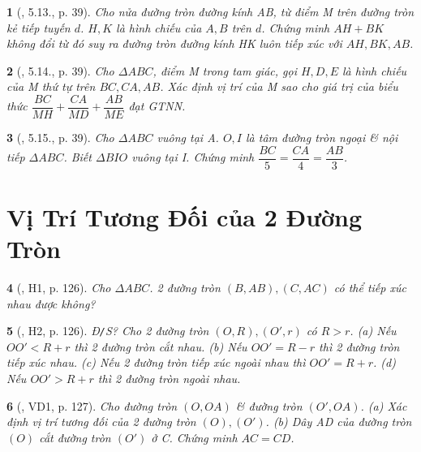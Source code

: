 \documentclass{article}
\newtheorem{baitoan}{}
\begin{document}
\begin{baitoan}[\cite{TLCT_THCS_Toan_9_hinh_hoc}, 5.13., p. 39]
	Cho nửa đường tròn đường kính AB, từ điểm M trên đường tròn kẻ tiếp tuyến $d$. $H,K$ là hình chiếu của $A,B$ trên $d$. Chứng minh $AH + BK$ không đổi từ đó suy ra đường tròn đường kính HK luôn tiếp xúc với $AH,BK,AB$.
\end{baitoan}

\begin{baitoan}[\cite{TLCT_THCS_Toan_9_hinh_hoc}, 5.14., p. 39]
	Cho $\Delta ABC$, điểm M trong tam giác, gọi $H,D,E$ là hình chiếu của M thứ tự trên $BC,CA,AB$. Xác định vị trí của M sao cho giá trị của biểu thức $\dfrac{BC}{MH} + \dfrac{CA}{MD} + \dfrac{AB}{ME}$ đạt {\rm GTNN}.
\end{baitoan}

\begin{baitoan}[\cite{TLCT_THCS_Toan_9_hinh_hoc}, 5.15., p. 39]
	Cho $\Delta ABC$ vuông tại A. $O,I$ là tâm đường tròn ngoại \& nội tiếp $\Delta ABC$. Biết $\Delta BIO$ vuông tại I. Chứng minh $\dfrac{BC}{5} = \dfrac{CA}{4} = \dfrac{AB}{3}$.
\end{baitoan}


\section{Vị Trí Tương Đối của 2 Đường Tròn}

\begin{baitoan}[\cite{Binh_boi_duong_Toan_9_tap_1}, H1, p. 126]
	Cho $\Delta ABC$. 2 đường tròn $(B,AB),(C,AC)$ có thể tiếp xúc nhau được không?
\end{baitoan}

\begin{baitoan}[\cite{Binh_boi_duong_Toan_9_tap_1}, H2, p. 126]
	{\rm Đ{\tt/}S?} Cho 2 đường tròn $(O,R),(O',r)$ có $R > r$. (a) Nếu $OO' < R + r$ thì 2 đường tròn cắt nhau. (b) Nếu $OO' = R - r$ thì 2 đường tròn tiếp xúc nhau. (c) Nếu 2 đường tròn tiếp xúc ngoài nhau thì $OO' = R + r$. (d) Nếu $OO' > R + r$ thì 2 đường tròn ngoài nhau.
\end{baitoan}

\begin{baitoan}[\cite{Binh_boi_duong_Toan_9_tap_1}, VD1, p. 127]
	Cho đường tròn $(O,OA)$ \& đường tròn $(O',OA)$. (a) Xác định vị trí tương đối của 2 đường tròn $(O),(O')$. (b) Dây AD của đường tròn $(O)$ cắt đường tròn $(O')$ ở C. Chứng minh $AC = CD$.
\end{baitoan}
\end{document}
